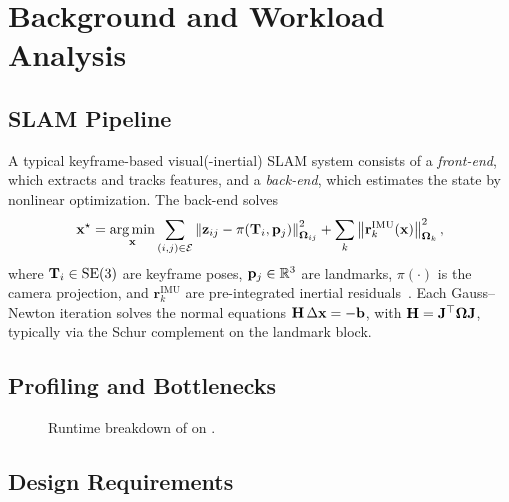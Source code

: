 \section{Background and Workload Analysis}
\label{sec:background}

\subsection{SLAM Pipeline}
\label{sec:background:pipeline}
A typical keyframe-based visual(-inertial) SLAM system consists of a
\emph{front-end}, which extracts and tracks features, and a \emph{back-end},
which estimates the state by nonlinear optimization.
The back-end solves
\begin{equation}
  \mathbf{x}^\star = \operatorname*{arg\,min}_{\mathbf{x}}
  \sum_{(i,j)\in\mathcal{E}}
  \left\lVert\mathbf{z}_{ij} - \pi\!\left(\mathbf{T}_i, \mathbf{p}_j\right)\right\rVert^2_{\boldsymbol{\Omega}_{ij}}
  + \sum_{k} \left\lVert\mathbf{r}^{\text{IMU}}_k(\mathbf{x})\right\rVert^2_{\boldsymbol{\Omega}_k},
  \label{eq:ba}
\end{equation}
where $\mathbf{T}_i \in \mathrm{SE}(3)$ are keyframe poses, $\mathbf{p}_j\in\mathbb{R}^3$ are
landmarks, $\pi(\cdot)$ is the camera projection, and
$\mathbf{r}^{\text{IMU}}_k$ are pre-integrated inertial residuals~\cite{forster2017preintegration}.
Each Gauss--Newton iteration solves the normal equations
$\mathbf{H}\,\Delta\mathbf{x} = -\mathbf{b}$, with $\mathbf{H} = \mathbf{J}^\top\boldsymbol{\Omega}\mathbf{J}$,
typically via the Schur complement on the landmark block.


\subsection{Profiling and Bottlenecks}
\label{sec:background:profiling}

\begin{figure}[t]
  \centering
  \caption{Runtime breakdown of  on .}
  \label{fig:profile}
\end{figure}

\subsection{Design Requirements}

